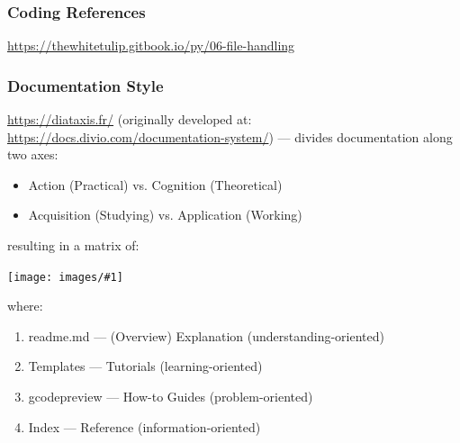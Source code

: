\documentclass{ltxdoc}
\newcommand{\includeimage}[1]{\bigskip\noindent\texttt{[image: images/\#1]}\bigskip}
\begin{document}
%
%
%
%

\subsubsection*{Coding References}

\url{https://thewhitetulip.gitbook.io/py/06-file-handling}

\subsubsection*{Documentation Style}
 
\url{https://diataxis.fr/} (originally developed at: \url{https://docs.divio.com/documentation-system/}) --- divides documentation along two axes:

\begin{itemize}
\item Action (Practical) vs. Cognition (Theoretical)
\item Acquisition (Studying) vs. Application (Working)
\end{itemize}

\noindent resulting in a matrix of:

\includeimage{diataxis_overview.png}

\noindent where:

\begin{enumerate}
\item readme.md --- (Overview) Explanation (understanding-oriented) %
\item Templates --- Tutorials (learning-oriented)
\item gcodepreview --- How-to Guides (problem-oriented)
\item Index --- Reference (information-oriented)
\end{enumerate}
\end{document}
